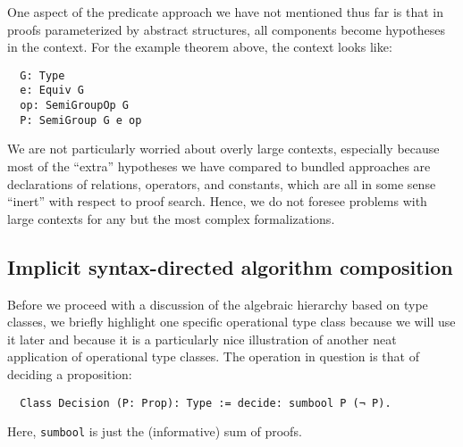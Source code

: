 \documentclass[a4paper,10pt,runningheads]{llncs}
\begin{document}


One aspect of the predicate approach we have not mentioned thus far is that in proofs parameterized by abstract structures, all components become hypotheses in the context. For the example theorem above, the context looks like:
\begin{lstlisting}
  G: Type
  e: Equiv G
  op: SemiGroupOp G
  P: SemiGroup G e op
\end{lstlisting}
We are not particularly worried about overly large contexts, especially because most of the ``extra'' hypotheses we have compared to bundled approaches are declarations of relations, operators, and constants, which are all in some sense ``inert'' with respect to proof search. Hence, we do not foresee problems with large contexts for any but the most complex formalizations.

\subsection{Implicit syntax-directed algorithm composition}

Before we proceed with a discussion of the algebraic hierarchy based on type classes, we briefly highlight one specific operational type class because we will use it later and because it is a particularly nice illustration of another neat application of operational type classes. The operation in question is that of deciding a proposition:
\begin{lstlisting}
  Class Decision (P: Prop): Type := decide: sumbool P (¬ P).
\end{lstlisting}
Here, \lstinline|sumbool| is just the (informative) sum of proofs.
\end{document}
